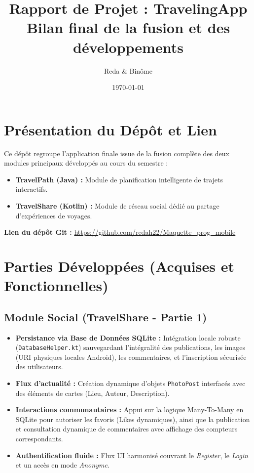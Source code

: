 \documentclass[11pt,a4paper]{article}
\title{\textbf{\textcolor{primary}{Rapport de Projet : TravelingApp}} \\ \large Bilan final de la fusion et des développements}
\author{Reda \& Binôme}
\date{\today}
\begin{document}
\maketitle
\thispagestyle{empty}

\vspace{1cm}

\section{Présentation du Dépôt et Lien}
Ce dépôt regroupe l'application finale issue de la fusion complète des deux modules principaux développés au cours du semestre :
\begin{itemize}
    \item \textbf{TravelPath (Java) :} Module de planification intelligente de trajets interactifs.
    \item \textbf{TravelShare (Kotlin) :} Module de réseau social dédié au partage d'expériences de voyages.
\end{itemize}

\vspace{0.5cm}
\noindent \textbf{Lien du dépôt Git :} \url{https://github.com/redah22/Maquette_prog_mobile}
\vspace{1cm}

\section{Parties Développées (Acquises et Fonctionnelles)}

\subsection{Module Social (TravelShare - Partie 1)}
\begin{itemize}[label=\textcolor{primary}{\textbullet}]
    \item \textbf{Persistance via Base de Données SQLite :} Intégration locale robuste (\texttt{DatabaseHelper.kt}) sauvegardant l'intégralité des publications, les images (URI physiques locales Android), les commentaires, et l'inscription sécurisée des utilisateurs.
    \item \textbf{Flux d'actualité :} Création dynamique d'objets \texttt{PhotoPost} interfacés avec des éléments de cartes (Lieu, Auteur, Description).
    \item \textbf{Interactions communautaires :} Appui sur la logique Many-To-Many en SQLite pour autoriser les favoris (Likes dynamiques), ainsi que la publication et consultation dynamique de commentaires avec affichage des compteurs correspondants.
    \item \textbf{Authentification fluide :} Flux UI harmonisé couvrant le \textit{Register}, le \textit{Login} et un accès en mode \textit{Anonyme}.
\end{itemize}
\end{document}
